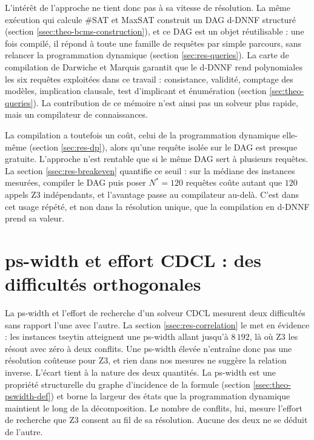 \documentclass[11pt,a4paper]{report}
\theoremstyle{plain}
\theoremstyle{definition}
\begin{document}
L'intérêt de l'approche ne tient donc pas à sa vitesse de
résolution. La même exécution qui calcule \#SAT et MaxSAT construit
un DAG d-DNNF structuré (section \ref{ssec:theo-bcms-construction}),
et ce DAG est un objet réutilisable : une fois compilé, il répond à
toute une famille de requêtes par simple parcours, sans relancer la
programmation dynamique (section \ref{sec:res-queries}). La carte de
compilation de Darwiche et Marquis \cite{darwiche2002} garantit que
le d-DNNF rend polynomiales les six requêtes exploitées dans ce
travail : consistance, validité, comptage des modèles, implication
clausale, test d'implicant et énumération
(section \ref{sec:theo-queries}). La contribution de ce mémoire
n'est ainsi pas un solveur plus rapide, mais un compilateur de
connaissances.

La compilation a toutefois un coût, celui de la programmation
dynamique elle-même (section \ref{sec:res-dp}), alors qu'une requête
isolée sur le DAG est presque gratuite. L'approche n'est rentable
que si le même DAG sert à plusieurs requêtes. La
section \ref{ssec:res-breakeven} quantifie ce seuil : sur la médiane
des instances mesurées, compiler le DAG puis poser $N^* = 120$
requêtes coûte autant que $120$ appels Z3 indépendants, et
l'avantage passe au compilateur au-delà. C'est dans cet usage
répété, et non dans la résolution unique, que la compilation en
d-DNNF prend sa valeur.

\section{ps-width et effort CDCL : des difficultés orthogonales}
\label{sec:disc-pswidth-cdcl}

La ps-width et l'effort de recherche d'un solveur CDCL mesurent
deux difficultés sans rapport l'une avec l'autre. La
section \ref{ssec:res-correlation} le met en évidence : les
instances tseytin atteignent une ps-width allant jusqu'à $8\,192$,
là où Z3 les résout avec zéro à deux conflits. Une ps-width élevée
n'entraîne donc pas une résolution coûteuse pour Z3, et rien dans
nos mesures ne suggère la relation inverse. L'écart tient à la
nature des deux quantités. La ps-width est une propriété
structurelle du graphe d'incidence de la formule
(section \ref{ssec:theo-pswidth-def}) et borne la largeur des états
que la programmation dynamique maintient le long de la
décomposition. Le nombre de conflits, lui, mesure l'effort de
recherche que Z3 consent au fil de sa résolution. Aucune des deux
ne se déduit de l'autre.
\end{document}
